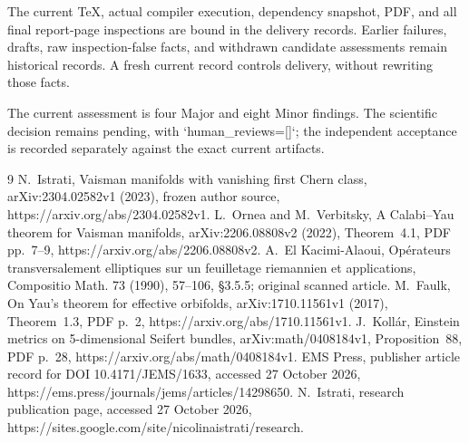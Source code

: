 \documentclass[10pt]{article}
\begin{document}
The current TeX, actual compiler execution, dependency snapshot, PDF, and all final report-page inspections are bound in the delivery records. Earlier failures, drafts, raw inspection-false facts, and withdrawn candidate assessments remain historical records. A fresh current record controls delivery, without rewriting those facts.\par
The current assessment is four Major and eight Minor findings. The scientific decision remains pending, with `human\_reviews=[]`; the independent acceptance is recorded separately against the exact current artifacts.\par
9 N. Istrati, Vaisman manifolds with vanishing first Chern class, arXiv:2304.02582v1 (2023), frozen author source, https://arxiv.org/abs/2304.02582v1. L. Ornea and M. Verbitsky, A Calabi–Yau theorem for Vaisman manifolds, arXiv:2206.08808v2 (2022), Theorem 4.1, PDF pp. 7–9, https://arxiv.org/abs/2206.08808v2. A. El Kacimi-Alaoui, Opérateurs transversalement elliptiques sur un feuilletage riemannien et applications, Compositio Math. 73 (1990), 57–106, §3.5.5; original scanned article. M. Faulk, On Yau’s theorem for effective orbifolds, arXiv:1710.11561v1 (2017), Theorem 1.3, PDF p. 2, https://arxiv.org/abs/1710.11561v1. J. Kollár, Einstein metrics on 5-dimensional Seifert bundles, arXiv:math/0408184v1, Proposition 88, PDF p. 28, https://arxiv.org/abs/math/0408184v1. EMS Press, publisher article record for DOI 10.4171/JEMS/1633, accessed 27 October 2026, https://ems.press/journals/jems/articles/14298650. N. Istrati, research publication page, accessed 27 October 2026, https://sites.google.com/site/nicolinaistrati/research.\par
\end{document}
